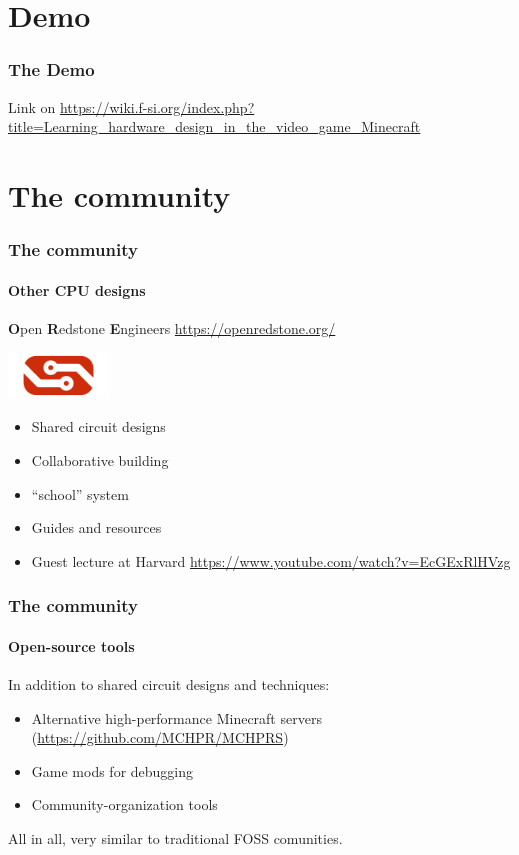 \documentclass[aspectratio=169]{beamer}
\newcommand{\rvlink}{https://wiki.f-si.org/index.php?title=Learning_hardware_design_in_the_video_game_Minecraft}
\begin{document}
\section{Demo}

\begin{frame}
	\frametitle{The Demo}
	Link on \url{\rvlink}

\end{frame}

\section{The community}

\begin{frame}
	\frametitle{The community}
	\framesubtitle{Other CPU designs}

	\textbf{O}pen \textbf{R}edstone \textbf{E}ngineers
	\url{https://openredstone.org/}

	\includegraphics[width=0.2\textwidth]{imgs/ore.png}

	\begin{itemize}

		\item Shared circuit designs
		\item Collaborative building
		\item ``school'' system
		\item Guides and resources
		\item Guest lecture at Harvard \url{https://www.youtube.com/watch?v=EcGExRlHVzg}
	\end{itemize}
\end{frame}

\begin{frame}
	\frametitle{The community}
	\framesubtitle{Open-source tools}

	In addition to shared circuit designs and techniques:

	\begin{itemize}
		\item Alternative high-performance Minecraft servers (\url{https://github.com/MCHPR/MCHPRS})
		\item Game mods for debugging
		\item Community-organization tools
	\end{itemize}

	All in all, very similar to traditional FOSS comunities.

\end{frame}
\end{document}

